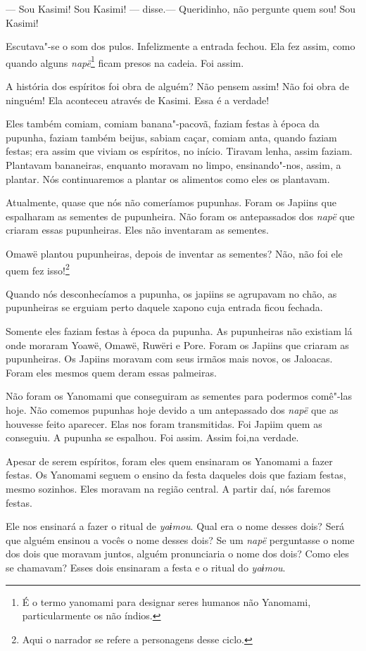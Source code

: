 --- Sou Kasimi! Sou Kasimi! --- disse.--- Queridinho, não pergunte quem
sou! Sou Kasimi!

Escutava"-se o som dos pulos. Infelizmente a entrada fechou. Ela fez
assim, como quando alguns \emph{napë}\footnote{  É o termo yanomami para designar seres humanos não Yanomami,
particularmente os não índios.}  ficam presos na
cadeia. Foi assim. 

A história dos espíritos foi obra de alguém? Não pensem assim! Não foi
obra de ninguém! Ela aconteceu através de Kasimi. Essa é a verdade! 

Eles também comiam, comiam banana"-pacovã, faziam festas à época da
pupunha, faziam também beijus, sabiam caçar, comiam anta, quando faziam
festas; era assim que viviam os espíritos, no início. Tiravam lenha,
assim faziam. Plantavam bananeiras, enquanto moravam no limpo,
ensinando"-nos, assim, a plantar. Nós continuaremos a plantar os
alimentos como eles os plantavam. 

Atualmente, quase que nós não comeríamos pupunhas. Foram os Japiins que
espalharam as sementes de pupunheira. Não foram os antepassados
dos \emph{napë} que criaram essas pupunheiras. Eles não inventaram as
sementes. 

Omawë plantou pupunheiras, depois de inventar as sementes? Não, não foi
ele quem fez isso!\footnote{  Aqui o narrador se refere a personagens desse ciclo.} 

Quando nós desconhecíamos a pupunha, os japiins se agrupavam no chão, as
pupunheiras se erguiam perto daquele xapono cuja entrada ficou fechada. 

Somente eles faziam festas à época da pupunha. As pupunheiras não
existiam lá onde moraram Yoawë, Omawë, Ruwëri e Pore. Foram os Japiins
que criaram as pupunheiras. Os Japiins moravam com seus irmãos mais
novos, os Jaloacas. Foram eles mesmos quem deram essas palmeiras. 

Não foram os Yanomami que conseguiram as sementes para podermos comê"-las
hoje. Não comemos pupunhas hoje devido a um antepassado
dos \emph{napë} que as houvesse feito aparecer. Elas nos foram
transmitidas. Foi Japiim quem as conseguiu. A pupunha se espalhou. Foi
assim. Assim foi,na verdade. 

Apesar de serem espíritos, foram eles quem ensinaram os Yanomami a fazer
festas. Os Yanomami seguem o ensino da festa daqueles dois que faziam
festas, mesmo sozinhos. Eles moravam na região central. A partir daí,
nós faremos festas. 

Ele nos ensinará a fazer o ritual de \emph{yaɨmou}. Qual era o nome
desses dois? Será que alguém ensinou a vocês o nome desses dois? Se
um \emph{napë} perguntasse o nome dos dois que moravam juntos, alguém
pronunciaria o nome dos dois? Como eles se chamavam? Esses dois
ensinaram a festa e o ritual do \emph{yaɨmou}. 

 

 

